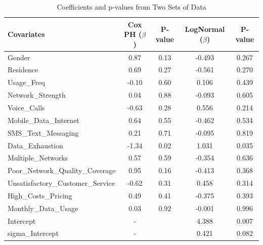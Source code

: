 \documentclass[doublespacing]{report} %
\begin{document}
\begin{table}[ht]
\centering
\caption{Coefficients and p-values from Two Sets of Data}
\begin{tabular}{lcccc}
\hline
Covariates& Cox PH ($\beta$)& P-value & LogNormal ($\beta$)& P-value\\
\hline
Gender & 0.87 & 0.13 & -0.493 & 0.267 \\
Residence & 0.69 & 0.27 & -0.561 & 0.270 \\
Usage\_Freq & -0.10 & 0.60 & 0.106 & 0.439 \\
Network\_Strength & 0.04 & 0.88 & -0.093 & 0.605 \\
Voice\_Calls & -0.63 & 0.28 & 0.556 & 0.214 \\
Mobile\_Data\_Internet & 0.64 & 0.55 & -0.462 & 0.534 \\
SMS\_Text\_Messaging & 0.21 & 0.71 & -0.095 & 0.819 \\
Data\_Exhaustion & -1.34 & 0.02 & 1.031 & 0.035 \\
Multiple\_Networks & 0.57 & 0.59 & -0.354 & 0.636 \\
Poor\_Network\_Quality\_Coverage & 0.95 & 0.16 & -0.413 & 0.368 \\
Unsatisfactory\_Customer\_Service & -0.62 & 0.31 & 0.458 & 0.314 \\
High\_Costs\_Pricing & 0.49 & 0.41 & -0.375 & 0.393 \\
Monthly\_Data\_Usage & 0.03 & 0.92 & -0.001 & 0.996 \\
Intercept & -& & 4.388 & 0.007 \\
sigma\_Intercept & -& & 0.421 & 0.082 \\
\hline
\end{tabular}
\label{tab:combined_coefficients}
\end{table}
\end{document}
